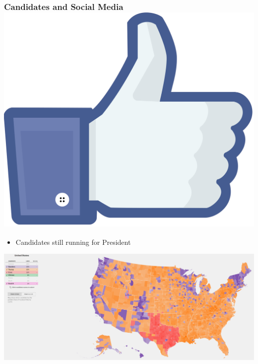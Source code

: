 \documentclass[xcolor=dvipsnames]{beamer}
\begin{document}
\begin{frame}
\frametitle{Candidates and Social Media  \hfill \includegraphics[scale=.015]{images/likes.png}}

\begin{itemize}
\item Candidates still running for President
\end{itemize}
\begin{center}

\includegraphics[scale=.14]{currentcandidate.png}
\end{center}
\end{frame}
\end{document}
